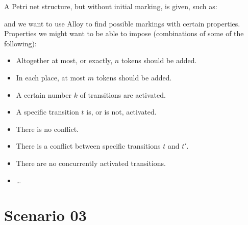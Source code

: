 \documentclass{article}
\begin{document}
A Petri net structure, but without initial marking, is given, such as:
\begin{center}
\end{center}
and we want to use Alloy to find possible markings with certain properties.
Properties we might want to be able to impose (combinations of some of the following):
\begin{itemize}
\item
  Altogether at most, or exactly, $n$ tokens should be added.
\item
  In each place, at most $m$ tokens should be added.
\item
  A certain number $k$ of transitions are activated.
\item
  A specific transition $t$ is, or is not, activated.
\item
  There is no conflict.
\item
  There is a conflict between specific transitions $t$ and $t'$.
\item
  There are no concurrently activated transitions.
\item
  \dots
\end{itemize}

\pagebreak

\section*{Scenario 03}
\end{document}
